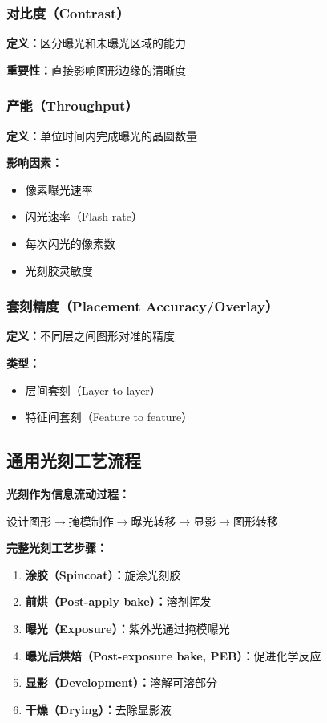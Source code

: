 \documentclass[UTF8,12pt,a4paper]{ctexart}
\begin{document}
\subsubsection{对比度（Contrast）}

\textbf{定义：}区分曝光和未曝光区域的能力

\textbf{重要性：}直接影响图形边缘的清晰度

\subsubsection{产能（Throughput）}

\textbf{定义：}单位时间内完成曝光的晶圆数量

\textbf{影响因素：}
\begin{itemize}
    \item 像素曝光速率
    \item 闪光速率（Flash rate）
    \item 每次闪光的像素数
    \item 光刻胶灵敏度
\end{itemize}

\subsubsection{套刻精度（Placement Accuracy/Overlay）}

\textbf{定义：}不同层之间图形对准的精度

\textbf{类型：}
\begin{itemize}
    \item 层间套刻（Layer to layer）
    \item 特征间套刻（Feature to feature）
\end{itemize}

\subsection{通用光刻工艺流程}

\textbf{光刻作为信息流动过程：}

设计图形$\rightarrow$掩模制作$\rightarrow$曝光转移$\rightarrow$显影$\rightarrow$图形转移

\textbf{完整光刻工艺步骤：}
\begin{enumerate}
    \item \textbf{涂胶（Spincoat）：}旋涂光刻胶
    \item \textbf{前烘（Post-apply bake）：}溶剂挥发
    \item \textbf{曝光（Exposure）：}紫外光通过掩模曝光
    \item \textbf{曝光后烘焙（Post-exposure bake, PEB）：}促进化学反应
    \item \textbf{显影（Development）：}溶解可溶部分
    \item \textbf{干燥（Drying）：}去除显影液
\end{enumerate}
\end{document}
